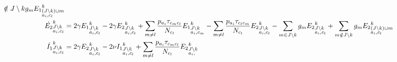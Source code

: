 \documentclass{beamer}
\begin{document}
\begin{frame}
\begin{tiny}
\begin{align}
{  \notin J \setminus k} g_m {E_1}^k_{\begin{subarray}{l} (J \setminus k) \cup m \\ a_i, c_l \end{subarray}} 
\notag \\
\dot{E_2}^k_{\begin{subarray}{l}J \setminus k\\ a_i, c_l \end{subarray}}
&=2 \gamma {E_1}^k_{\begin{subarray}{l}J \setminus k\\ a_i,
    c_l \end{subarray}} -2 \gamma {E_2}^k_{\begin{subarray}{l}J \setminus k\\ a_i, c_l \end{subarray}}
+\sum_{m\neq l} \frac{p_{a_i} \tau_{c_mc_l}}{N_{c_l}} {E_1}^k_{\begin{subarray}{l}J \setminus k\\ a_i,
    c_m \end{subarray}} -\sum_{m\neq l} \frac{p_{a_i}  \tau_{c_lc_m}}{N_{c_l}} {E_2}^k_{\begin{subarray}{l}J \setminus k\\ a_i,
    c_l \end{subarray}} -\sum_{m
  \in J \setminus k} g_m {E_2}^k_{\begin{subarray}{l}J \setminus k\\ a_i, c_l \end{subarray}} + \sum_{m
  \notin J \setminus k} g_m {E_2}^k_{\begin{subarray}{l} (J \setminus k) \cup m \\ a_i, c_l \end{subarray}}  \notag \\
\dot{I_1}^k_{\begin{subarray}{l}J \setminus k\\ a_i, c_l \end{subarray}} &=2 \gamma {E_2}^k_{\begin{subarray}{l}J \setminus k\\ a_i, c_l \end{subarray}}
-2 \nu {I_1}^k_{\begin{subarray}{l}J \setminus k\\ a_i,
    c_l \end{subarray}} + \sum_{m\neq l} \frac{p_{a_i} \tau_{c_mc_l}}{N_{c_l}} {E_2}^k_{\begin{subarray}{l}J \setminus k\\ a_i,

\end{subarray}}
\end{align}
\end{tiny}
\end{frame}
\end{document}
